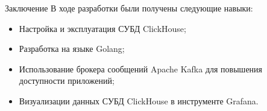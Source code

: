 \documentclass{beamer}
\begin{document}
\begin{frame}{Заключение}
	В ходе разработки были получены следующие навыки:
	\begin{itemize}
		\item Настройка и эксплуатация СУБД ClickHouse;
		\item Разработка на языке Golang;
		\item Использование брокера сообщений Apache Kafka для повышения доступности приложений;
		\item Визуализации данных СУБД ClickHouse в инструменте Grafana.
	\end{itemize}
\end{frame}
\end{document}
